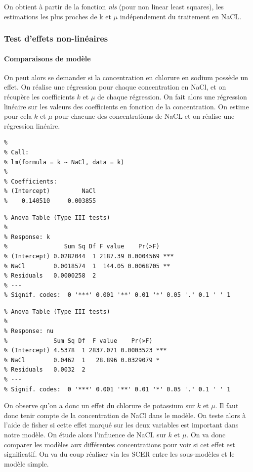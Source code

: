 \documentclass[
]{article}
\begin{document}
On obtient à partir de la fonction \emph{nls} (pour non linear least
squares), les estimations les plus proches de k et \(\mu\) indépendement
du traitement en NaCL.

\hypertarget{test-deffets-non-linuxe9aires}{%
\subsubsection{Test d'effets
non-linéaires}\label{test-deffets-non-linuxe9aires}}

\hypertarget{comparaisons-de-moduxe8le}{%
\paragraph{Comparaisons de modèle}\label{comparaisons-de-moduxe8le}}

On peut alors se demander si la concentration en chlorure en sodium
possède un effet. On réalise une régression pour chaque concentration en
NaCl, et on récupère les coefficients \(k\) et \(\mu\) de chaque
régression. On fait alors une régression linéaire sur les valeurs des
coefficients en fonction de la concentration. On estime pour cela \(k\)
et \(\mu\) pour chacune des concentrations de NaCL et on réalise une
régression linéaire.

\begin{verbatim}
% 
% Call:
% lm(formula = k ~ NaCl, data = k)
% 
% Coefficients:
% (Intercept)         NaCl  
%    0.140510     0.003855
\end{verbatim}

\begin{verbatim}
% Anova Table (Type III tests)
% 
% Response: k
%                Sum Sq Df F value    Pr(>F)    
% (Intercept) 0.0282044  1 2187.39 0.0004569 ***
% NaCl        0.0018574  1  144.05 0.0068705 ** 
% Residuals   0.0000258  2                      
% ---
% Signif. codes:  0 '***' 0.001 '**' 0.01 '*' 0.05 '.' 0.1 ' ' 1
\end{verbatim}

\begin{verbatim}
% Anova Table (Type III tests)
% 
% Response: nu
%             Sum Sq Df  F value    Pr(>F)    
% (Intercept) 4.5378  1 2837.071 0.0003523 ***
% NaCl        0.0462  1   28.896 0.0329079 *  
% Residuals   0.0032  2                       
% ---
% Signif. codes:  0 '***' 0.001 '**' 0.01 '*' 0.05 '.' 0.1 ' ' 1
\end{verbatim}

On observe qu'on a donc un effet du chlorure de potassium sur \(k\) et
\(\mu\). Il faut donc tenir compte de la concentration de NaCl dans le
modèle. On teste alors à l'aide de fisher si cette effet marqué sur les
deux variables est important dans notre modèle. On étude alors
l'influence de NaCL sur \(k\) et \(\mu\). On va donc comparer les
modèles aux différentes concentrations pour voir si cet effet est
significatif. On va du coup réaliser via les SCER entre les sous-modèles
et le modèle simple.
\end{document}
